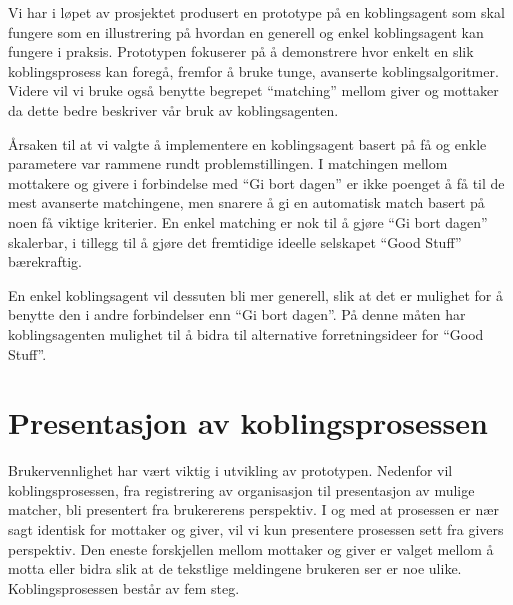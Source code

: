 Vi har i løpet av prosjektet produsert en prototype på en koblingsagent som skal fungere som en illustrering på hvordan en generell og enkel koblingsagent kan fungere i praksis. Prototypen fokuserer på å demonstrere hvor enkelt en slik koblingsprosess kan foregå, fremfor å bruke tunge, avanserte koblingsalgoritmer. Videre vil vi bruke også benytte begrepet ``matching'' mellom giver og mottaker da dette bedre beskriver vår bruk av koblingsagenten.

Årsaken til at vi valgte å implementere en koblingsagent basert på få og enkle parametere var rammene rundt problemstillingen. I matchingen mellom mottakere og givere i forbindelse med ``Gi bort dagen'' er ikke poenget å få til de mest avanserte matchingene, men snarere å gi en automatisk match basert på noen få viktige kriterier. En enkel matching er nok til å gjøre ``Gi bort dagen'' skalerbar, i tillegg til å gjøre det fremtidige ideelle selskapet ``Good Stuff'' bærekraftig.

En enkel koblingsagent vil dessuten bli mer generell, slik at det er mulighet for å benytte den i andre forbindelser enn ``Gi bort dagen''. På denne måten har koblingsagenten mulighet til å bidra til alternative forretningsideer for ``Good Stuff''.

\section{Presentasjon av koblingsprosessen}
\label{sec:koblingsprosessen}
Brukervennlighet har vært viktig i utvikling av prototypen. Nedenfor vil koblingsprosessen, fra registrering av organisasjon til presentasjon av mulige matcher, bli presentert fra brukererens perspektiv. I og med at prosessen er nær sagt identisk for mottaker og giver, vil vi kun presentere prosessen sett fra givers perspektiv. Den eneste forskjellen mellom mottaker og giver er valget mellom å motta eller bidra slik at de tekstlige meldingene brukeren ser er noe ulike.\\

Koblingsprosessen består av fem steg.\\

\newpage

